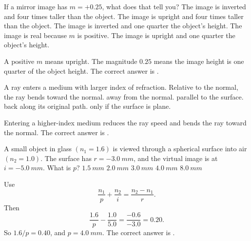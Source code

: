 \documentclass[full,print,11pt,a4paper]{physicsquiz}
\begin{document}
\begin{quizbank}
  \begin{quizquestion}[
    id=optics-magnification-007,
    topic=magnification,
    difficulty=applied,
    marks=1,
    correct=E,
    tags={magnification,signs},
    outcome={Interpret magnification sign and value}
  ]
    If a mirror image has \(m=+0.25\), what does that tell you?
    \choices
      {The image is inverted and four times taller than the object.}
      {The image is upright and four times taller than the object.}
      {The image is inverted and one quarter the object's height.}
      {The image is real because \(m\) is positive.}
      {The image is upright and one quarter the object's height.}
  \end{quizquestion}
  \begin{quizsolution}
    A positive \(m\) means upright. The magnitude \(0.25\) means the image height
    is one quarter of the object height. The correct answer is
    \quizcorrectletter.
  \end{quizsolution}

  \begin{quizquestion}[
    id=optics-refraction-008,
    topic=refracting-surfaces,
    difficulty=foundation,
    marks=1,
    correct=A,
    tags={refraction,index},
    outcome={Identify ray bending at a refracting surface}
  ]
    A ray enters a medium with larger index of refraction. Relative to the normal,
    the ray bends
    \choices
      {toward the normal.}
      {away from the normal.}
      {parallel to the surface.}
      {back along its original path.}
      {only if the surface is plane.}
  \end{quizquestion}
  \begin{quizsolution}
    Entering a higher-index medium reduces the ray speed and bends the ray toward
    the normal. The correct answer is \quizcorrectletter.
  \end{quizsolution}

  \begin{quizquestion}[
    id=optics-refraction-009,
    topic=refracting-surfaces,
    difficulty=applied,
    marks=1,
    correct=D,
    tags={spherical-refraction,calculation},
    outcome={Use the spherical refracting surface formula}
  ]
    A small object in glass \((n_1=1.6)\) is viewed through a spherical surface
    into air \((n_2=1.0)\). The surface has \(r=-\SI{3.0}{mm}\), and the
    virtual image is at \(i=-\SI{5.0}{mm}\). What is \(p\)?
    \choices
      {\(\SI{1.5}{mm}\)}
      {\(\SI{2.0}{mm}\)}
      {\(\SI{3.0}{mm}\)}
      {\(\SI{4.0}{mm}\)}
      {\(\SI{8.0}{mm}\)}
  \end{quizquestion}
  \begin{quizsolution}
    Use
    \[
      \frac{n_1}{p}+\frac{n_2}{i}=\frac{n_2-n_1}{r}.
    \]
    Then
    \[
      \frac{1.6}{p}-\frac{1.0}{5.0}=\frac{-0.6}{-3.0}=0.20.
    \]
    So \(1.6/p=0.40\), and \(p=\SI{4.0}{mm}\). The correct answer is
    \quizcorrectletter.
  \end{quizsolution}


\end{quizbank}
\end{document}
